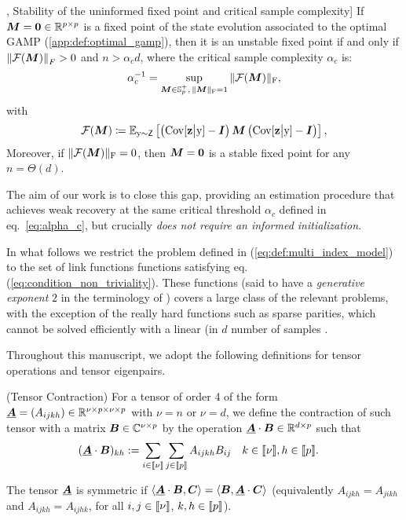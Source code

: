 \begin{lemma}\label{lemma:critical_sample_complexity}\cite{troiani2024fundamental}, Stability of the uninformed fixed point and critical sample complexity]
\label{def:critical_alpha}
    \label{thm:unin:stability}
    If ${\boldsymbol M}={\boldsymbol 0}\in\mathbb{R}^{p\times p}$ is a fixed point of the state evolution associated to the optimal GAMP (\ref{app:def:optimal_gamp}), then it is an unstable fixed point if and only if $\norm{\mathcal{F}({\boldsymbol M})}_F > 0$ and $n>\alpha_c d$, where the critical sample complexity $\alpha_c$ is:
    \begin{equation} 
    \label{eq:alpha_c}
        \alpha_c^{-1} = \sup_{{\boldsymbol M}\in \mathbb{S}^+_p,\,  \|{\boldsymbol M} \|_{\mathrm{F}} =1}  \|\mathcal{F}({\boldsymbol M}) \|_{\mathrm{F}} ,
    \end{equation}
    with 
    \begin{equation}\label{eq:def:operator_F}
        {\mathcal F}({\boldsymbol M}) \coloneqq \mathbb{E}_{{ \mathrm{y} }\sim\mathsf{Z}}\left[\left(\mathrm{Cov}[\boldsymbol{\mathbf{z}}\big| { \mathrm{y} }]-{\boldsymbol I}\right)\bm{M} \left(\mathrm{Cov}[\boldsymbol{\mathbf{z}}\big| { \mathrm{y} }]-{\boldsymbol I}\right)\right],
    \end{equation} 
    Moreover,
   if $ \|\mathcal{F}({\boldsymbol M}) \|_{\mathrm{F}}  = 0$, then ${\boldsymbol M}={\boldsymbol 0}$ is a stable fixed point for any $n = \Theta(d)$.
\end{lemma}

The aim of our work is to close this gap, providing an estimation procedure that achieves weak recovery at the same critical threshold $\alpha_{c}$ defined in eq.~\eqref{eq:alpha_c}, but crucially {\it does not require an informed initialization}. 

In what follows we restrict the problem defined in (\ref{eq:def:multi_index_model}) to the set of link functions functions satisfying eq. (\ref{eq:condition_non_triviality}). These functions (said to have a \emph{generative exponent} $2$ in the terminology of \cite{damian24a}) covers a large class of the relevant problems, with the exception of the really hard functions such as sparse parities, which cannot be solved efficiently with a linear (in $d$ number of samples \cite{troiani2024fundamental}.

Throughout this manuscript, we adopt the following definitions for tensor operations and tensor eigenpairs.
\begin{definition}(Tensor Contraction) For a tensor of order 4 of the form ${\underline{\bm{A}}}=(A_{ijkh}) \in\mathbb{R}^{\nu\times p \times \nu \times p}$ with $\nu = n$ or $\nu = d$, we define the contraction of such tensor with a matrix $\bm{B}\in\mathbb C^{\nu\times p}$ by the operation ${\underline{\bm{A}}}\cdot\bm{B} \in \mathbb{R}^{d \times p}$ such that
\begin{equation}
\begin{aligned}
    ({\underline{\bm{A}}}\cdot\bm{B})_{kh}
    &:=
\sum_{i\in \llbracket \nu \rrbracket }\sum_{j\in \llbracket p \rrbracket }A_{ijkh}B_{ij} \quad k\in \llbracket \nu \rrbracket ,h\in \llbracket p \rrbracket .
\end{aligned}
\end{equation}
\end{definition}
The tensor ${\underline{\bm{A}}}$ is symmetric if $\langle{\ensuremath{\underline{\bm{A}}}}\cdot\bm{B},\bm{C}\rangle = \langle\bm{B},{\underline{\bm{A}}}\cdot\bm{C}\rangle$ (equivalently $A_{ijkh} = A_{jikh}$ and $A_{ijkh} = A_{ijhk}$, for all $i,j\in \llbracket \nu \rrbracket $, $k,h\in \llbracket p \rrbracket $). 

